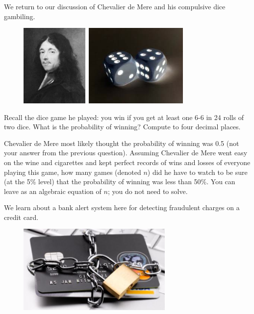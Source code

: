 \documentclass[12pt]{article}
\begin{document}
\eenum


\problem We return to our discussion of Chevalier de Mere and his compulsive dice gambiling.


\begin{figure}[htp]
\centering
\includegraphics[width=1.31in]{chevalier.jpg}~\includegraphics[width=2in]{dice.jpg}
\end{figure}

\benum

 Recall the dice game he played: you win if you get at least one 6-6 in 24 rolls of two dice. What is the probability of winning? Compute to four decimal places. 

 Chevalier de Mere most likely thought the probability of winning was 0.5 (not your answer from the previous question). Assuming Chevalier de Mere went easy on the wine and cigarettes and kept perfect records of wins and losses of everyone playing this game, how many games (denoted $n$) did he have to watch to be sure (at the 5\% level) that the probability of winning was less than 50\%. You can leave as an algebraic equation of $n$; you do not need to solve.


\eenum


\problem We learn about a bank alert system here for detecting fraudulent charges on a credit card.
\begin{figure}[htp]
\centering
\includegraphics[width=3in]{credit.jpg}
\end{figure}
\end{document}
